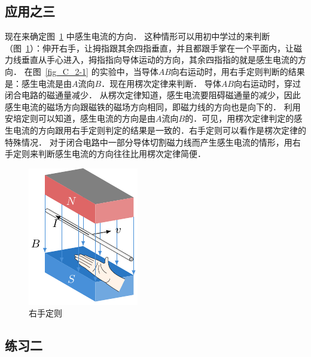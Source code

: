 \subsection*{应用之三} 


现在来确定图~\ref{fig_C_2-14} 中感生电流的方向．
这种情形可以用初中学过的来判断（图~\ref{fig_C_2-14}）：伸开右手，让拇指跟其余四指垂直，并且都跟手掌在一个平面内，让磁力线垂直从手心进入，拇指指向导体运动的方向，其余四指指的就是感生电流的方向．
在图~\ref{fig_C_2-1} 的实验中，当导体$AB$向右运动时，用右手定则判断的结果是：感生电流是由$A$流向$B$．现在用楞次定律来判断．
导体$AB$向右运动时，穿过闭合电路的磁通量减少．
从楞次定律知道，感生电流要阻碍磁通量的减少，因此感生电流的磁场方向跟磁铁的磁场方向相同，即磁力线的方向也是向下的．
利用安培定则可以知道，感生电流的方向是由$A$流向$B$的．可见，用楞次定律判定的感生电流的方向跟用右手定则判定的结果是一致的．右手定则可以看作是楞次定律的特殊情况．
对于闭合电路中一部分导体切割磁力线而产生感生电流的情形，用右手定则来判断感生电流的方向往往比用楞次定律简便．

\begin{figure}[htbp]
	\centering
	\includegraphics{fig/C/2-14.pdf}
	\caption{右手定则}\label{fig_C_2-14}
\end{figure}


\subsection*{练习二}


